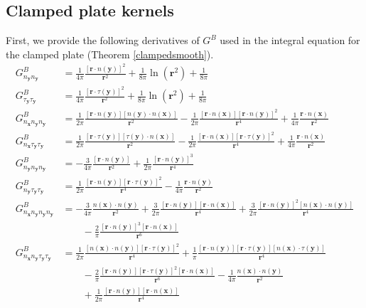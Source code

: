 \documentclass[preprint,12pt,3p]{elsarticle}
\begin{document}
\subsection{Clamped plate kernels} \label{appclamped}
First, we provide the following derivatives of $G^{B}$ used in the integral equation for the clamped plate (Theorem \ref{clampedsmooth}).
\begin{align}
    G^{B}_{n_\mathbf{y} n_\mathbf{y}} &= \frac{1}{4\pi} \frac{[\pmb{r}\cdot  n(\mathbf{y}) ]^2}{\pmb{r}^2} + \frac{1}{8\pi}\ln(\pmb{r}^2) + \frac{1}{8\pi} \\
    G^{B}_{\tau_\mathbf{y} \tau_\mathbf{y}} &= \frac{1}{4\pi} \frac{[\pmb{r}\cdot \tau(\mathbf{y})]^2}{\pmb{r}^2} + \frac{1}{8\pi}\ln(\pmb{r}^2) + \frac{1}{8\pi}\\
    G^{B}_{n_\mathbf{x} n_\mathbf{y} n_\mathbf{y}} &= \frac{1}{2\pi} \frac{[\pmb{r}\cdot n(\mathbf{y})][n(\mathbf{y}) \cdot  n(\mathbf{x}) ]}{\pmb{r}^2} - \frac{1}{2\pi} \frac{[\pmb{r}\cdot  n(\mathbf{x}) ][\pmb{r}\cdot n(\mathbf{y})]^2}{\pmb{r}^4} +\frac{1}{4\pi}\frac{\pmb{r}\cdot  n(\mathbf{x}) }{\pmb{r}^2}\\
    G^{B}_{n_\mathbf{x} \tau_\mathbf{y} \tau_\mathbf{y}} &= \frac{1}{2\pi} \frac{[\pmb{r}\cdot \tau(\mathbf{y})][\tau(\mathbf{y}) \cdot  n(\mathbf{x}) ]}{\pmb{r}^2} - \frac{1}{2\pi} \frac{[\pmb{r}\cdot  n(\mathbf{x}) ][\pmb{r}\cdot \tau(\mathbf{y})]^2}{\pmb{r}^4} +\frac{1}{4\pi}\frac{\pmb{r}\cdot  n(\mathbf{x}) }{\pmb{r}^2}\\
    G^{B}_{n_\mathbf{y} n_\mathbf{y} n_\mathbf{y}} &= -\frac{3}{4\pi} \frac{[\pmb{r}\cdot n(\mathbf{y})]}{\pmb{r}^2} + \frac{1}{2\pi} \frac{[\pmb{r}\cdot n(\mathbf{y})]^3}{\pmb{r}^4} \\
    G^{B}_{ n_\mathbf{y} \tau_\mathbf{y} \tau_\mathbf{y}} &=  \frac{1}{2\pi} \frac{[\pmb{r}\cdot  n(\mathbf{y}) ][\pmb{r}\cdot \tau(\mathbf{y})]^2}{\pmb{r}^4} -\frac{1}{4\pi}\frac{\pmb{r}\cdot  n(\mathbf{y}) }{\pmb{r}^2}\\
      G^{B}_{n_\mathbf{x} n_\mathbf{y} n_\mathbf{y} n_\mathbf{y}} &= -\frac{3}{4\pi} \frac{ n(\mathbf{x}) \cdot  n(\mathbf{y}) }{\pmb{r}^2} + \frac{3}{2\pi} \frac{[\pmb{r}\cdot  n(\mathbf{y}) ][\pmb{r}\cdot  n(\mathbf{x}) ]}{\pmb{r}^4}+ \frac{3}{2\pi} \frac{[\pmb{r}\cdot  n(\mathbf{y}) ]^2 [ n(\mathbf{x})  \cdot  n(\mathbf{y}) ]}{\pmb{r}^4} \nonumber \\
      &\qquad -\frac{2}{\pi} \frac{[\pmb{r} \cdot n(\mathbf{y})]^3[\pmb{r}\cdot n(\mathbf{x})]}{\pmb{r}^6} \\
    G^B_{n_\mathbf{x} n_\mathbf{y} \tau_\mathbf{y} \tau_\mathbf{y}} &=  \frac{1}{2\pi} \frac{[n(\mathbf{x}) \cdot n(\mathbf{y})][\pmb{r}\cdot \tau(\mathbf{y})]^2}{\pmb{r}^4} + \frac{1}{\pi} \frac{[\pmb{r}\cdot n(\mathbf{y})][\pmb{r}\cdot \tau(\mathbf{y})][n(\mathbf{x}) \cdot \tau(\mathbf{y})]}{\pmb{r}^4} \nonumber \\
    &\qquad - \frac{2}{\pi} \frac{[\pmb{r}\cdot n(\mathbf{y})][\pmb{r}\cdot \tau(\mathbf{y})]^2 [\pmb{r}\cdot n(\mathbf{x})]}{\pmb{r}^6} - \frac{1}{4\pi} \frac{n(\mathbf{x}) \cdot n(\mathbf{y}) }{\pmb{r}^2} \nonumber \\
    &\qquad + \frac{1}{2\pi} \frac{[\pmb{r}\cdot n(\mathbf{y})][\pmb{r}\cdot n(\mathbf{x})]}{\pmb{r}^4} 
\end{align}
\end{document}
